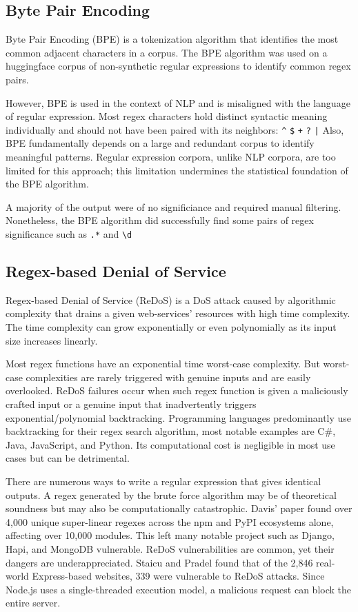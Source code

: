 \documentclass[10pt,twocolumn]{article}
\begin{document}
\subsection{Byte Pair Encoding}

Byte Pair Encoding (BPE) is a tokenization algorithm that identifies the most common adjacent characters in a corpus\cite{zouhar2023}.  The BPE algorithm was used on a huggingface corpus of non-synthetic regular expressions to identify common regex pairs\cite{huggingface}.

However, BPE is used in the context of NLP and is misaligned with the language of regular expression. Most regex characters hold distinct syntactic meaning individually and should not have been paired with its neighbors: \texttt{\^{}} \texttt{\$} \texttt{+} \texttt{?} \texttt{|} Also, BPE fundamentally depends on a large and redundant corpus to identify meaningful patterns. Regular expression corpora, unlike NLP corpora, are too limited for this approach; this limitation undermines the statistical foundation of the BPE algorithm.

A majority of the output were of no significiance and required manual filtering. Nonetheless, the BPE algorithm did successfully find some pairs of regex significance such as \texttt{.*} and \texttt{\textbackslash d} 

\subsection{Regex-based Denial of Service}

Regex-based Denial of Service (ReDoS) is a DoS attack caused by algorithmic complexity that drains a given web-services’ resources with high time complexity. The time complexity can grow exponentially or even polynomially as its input size increases linearly\cite{davis2018}.

Most regex functions have an exponential time worst-case complexity. But worst-case complexities are rarely triggered with genuine inputs and are easily overlooked. ReDoS failures occur when such regex function is given a maliciously crafted input or a genuine input that inadvertently triggers exponential/polynomial backtracking. Programming languages predominantly use backtracking for their regex search algorithm, most notable examples are C\#, Java, JavaScript, and Python\cite{hassan2022}. Its computational cost is negligible in most use cases but can be detrimental.

There are numerous ways to write a regular expression that gives identical outputs. A regex generated by the brute force algorithm may be of theoretical soundness but may also be computationally catastrophic. Davis' paper found over 4,000 unique super-linear regexes across the npm and PyPI ecosystems alone, affecting over 10,000 modules\cite{davis2018}. This left many notable project such as Django, Hapi, and MongoDB vulnerable. ReDoS vulnerabilities are common, yet their dangers are underappreciated. Staicu and Pradel found that of the 2,846 real-world Express-based websites, 339 were vulnerable to ReDoS attacks\cite{staicu2018}. Since Node.js uses a single-threaded execution model, a malicious request can block the entire server. 
\end{document}
